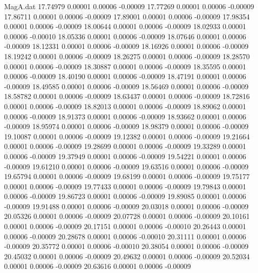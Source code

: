 \begin{filecontents}{MagA.dat}
  17.74979    0.00001    0.00006   -0.00009
  17.77269    0.00001    0.00006   -0.00009
  17.86711    0.00001    0.00006   -0.00009
  17.89001    0.00001    0.00006   -0.00009
  17.98354    0.00001    0.00006   -0.00009
  18.00644    0.00001    0.00006   -0.00009
  18.02933    0.00001    0.00006   -0.00010
  18.05336    0.00001    0.00006   -0.00009
  18.07646    0.00001    0.00006   -0.00009
  18.12331    0.00001    0.00006   -0.00009
  18.16926    0.00001    0.00006   -0.00009
  18.19242    0.00001    0.00006   -0.00009
  18.26275    0.00001    0.00006   -0.00009
  18.28570    0.00001    0.00006   -0.00009
  18.30887    0.00001    0.00006   -0.00009
  18.35595    0.00001    0.00006   -0.00009
  18.40190    0.00001    0.00006   -0.00009
  18.47191    0.00001    0.00006   -0.00009
  18.49585    0.00001    0.00006   -0.00009
  18.56469    0.00001    0.00006   -0.00009
  18.58782    0.00001    0.00006   -0.00009
  18.63437    0.00001    0.00006   -0.00009
  18.72816    0.00001    0.00006   -0.00009
  18.82013    0.00001    0.00006   -0.00009
  18.89062    0.00001    0.00006   -0.00009
  18.91373    0.00001    0.00006   -0.00009
  18.93662    0.00001    0.00006   -0.00009
  18.95974    0.00001    0.00006   -0.00009
  18.98379    0.00001    0.00006   -0.00009
  19.10087    0.00001    0.00006   -0.00009
  19.12382    0.00001    0.00006   -0.00009
  19.21664    0.00001    0.00006   -0.00009
  19.28699    0.00001    0.00006   -0.00009
  19.33289    0.00001    0.00006   -0.00009
  19.37949    0.00001    0.00006   -0.00009
  19.54221    0.00001    0.00006   -0.00009
  19.61210    0.00001    0.00006   -0.00009
  19.63516    0.00001    0.00006   -0.00009
  19.65794    0.00001    0.00006   -0.00009
  19.68199    0.00001    0.00006   -0.00009
  19.75177    0.00001    0.00006   -0.00009
  19.77433    0.00001    0.00006   -0.00009
  19.79843    0.00001    0.00006   -0.00009
  19.86723    0.00001    0.00006   -0.00009
  19.89085    0.00001    0.00006   -0.00009
  19.91488    0.00001    0.00006   -0.00009
  20.03018    0.00001    0.00006   -0.00009
  20.05326    0.00001    0.00006   -0.00009
  20.07728    0.00001    0.00006   -0.00009
  20.10161    0.00001    0.00006   -0.00009
  20.17151    0.00001    0.00006   -0.00010
  20.26443    0.00001    0.00006   -0.00009
  20.28678    0.00001    0.00006   -0.00010
  20.31111    0.00001    0.00006   -0.00009
  20.35772    0.00001    0.00006   -0.00010
  20.38054    0.00001    0.00006   -0.00009
  20.45032    0.00001    0.00006   -0.00009
  20.49632    0.00001    0.00006   -0.00009
  20.52034    0.00001    0.00006   -0.00009
  20.63616    0.00001    0.00006   -0.00009

\end{filecontents}

